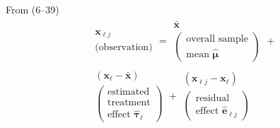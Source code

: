 \begin{enumerate}[label= (\alph*)]
    From (6--39)
    \begin{multline*}
        \begin{array}{c}
            \textbf{x}_{\ell j} \\
            \text{(observation)}
        \end{array}
        =
        \begin{array}{c}
            \bar{\textbf{x}} \\
            \left(
                \begin{array}{c}
                    \text{overall sample} \\
                    \text{mean } \hat{\bm{\mu}}
                \end{array}
            \right)
        \end{array}
        + \\
        \begin{array}{c}
            (\textbf{x}_{\ell} - \bar{\textbf{x}}) \\
            \left(
                \begin{array}{c}
                    \text{estimated} \\
                    \text{treatment} \\
                    \text{effect } \hat{\bm{\tau}}_{\ell}
                \end{array}
            \right)
        \end{array}
        +
        \begin{array}{c}
            (\textbf{x}_{\ell j} - \textbf{x}_{\ell}) \\
            \left(
                \begin{array}{c}
                    \text{residual } \\
                    \text{effect } \hat{\textbf{e}}_{\ell j}
                \end{array}
            \right)
        \end{array}
    \end{multline*}


\end{enumerate}
